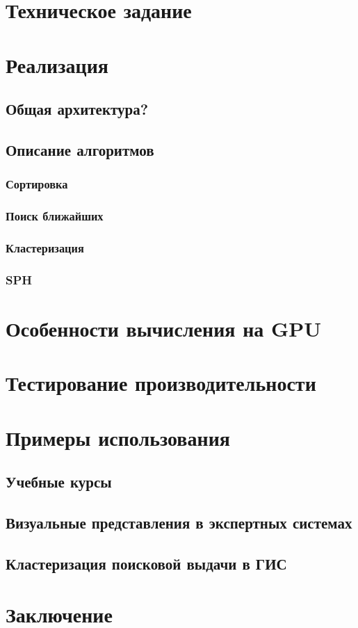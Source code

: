 \documentclass[a4paper,14pt,russian,nocolumnsxix,nocolumnxxxii,nocolumnxxxi,hpadding=10mm]{eskdtext}
\begin{document}
  
  
  \newpage
  \section{Техническое задание}
  \section{Реализация}
  \subsection{Общая архитектура?}
  \subsection{Описание алгоритмов}
  \subsubsection{Сортировка}
  \subsubsection{Поиск ближайших}
  \subsubsection{Кластеризация}
  \subsubsection{SPH}
  \section{Особенности вычисления на GPU}
  \section{Тестирование производительности}
  \section{Примеры использования}
  \subsection{Учебные курсы}
  \subsection{Визуальные представления в экспертных системах}
  \subsection{Кластеризация поисковой выдачи в ГИС}
  \section{Заключение}
  \newpage
  \tableofcontents 
\end{document}
